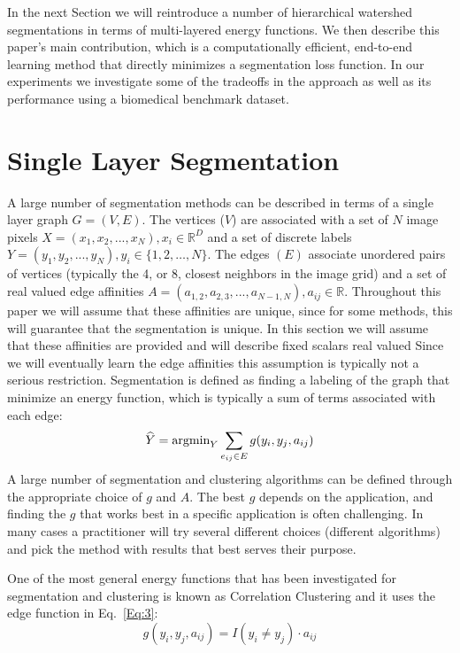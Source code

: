 \documentclass[letterpaper,twocolumn,fleqn]{article}
\begin{document}
In the next Section we will reintroduce a number of hierarchical watershed segmentations in terms of multi-layered energy functions. We then describe this paper's main contribution, which is a computationally efficient, end-to-end learning method that directly minimizes a segmentation loss function. In our experiments we investigate some of the tradeoffs in the approach as well as its performance using a biomedical benchmark dataset.

\section{Single Layer Segmentation}

A large number of segmentation methods can be described in terms of a single layer graph $G = (V, E)$. The vertices ($V$) are associated with a set of $N$ image pixels $X=(x_1,x_2,...,x_N), x_i \in \mathbb{R}^D$ and a set of discrete labels $Y=(y_1,y_2,...,y_N),y_i \in \{1,2,\ldots,N\}$. The edges $(E)$ associate unordered pairs of vertices (typically the 4, or 8, closest neighbors in the image grid) and a set of real valued edge affinities $A=(a_{1,2},a_{2,3},...,a_{N-1,N}), a_{ij} \in \mathbb{R}$. Throughout this paper we will assume that these affinities are unique, since for some methods, this will guarantee that the segmentation is unique. In this section we will assume that these affinities are provided and will describe fixed scalars real valued Since we will eventually learn the edge affinities this assumption is typically not a serious restriction. Segmentation is defined as finding a labeling of the graph that minimize an energy function, which is typically a sum of terms associated with each edge:
\begin{equation}
    \widehat{Y} =\hbox{argmin}_Y\sum_{e_{ij}\in E} g(y_i, y_j, a_{ij})
    \label{Eq:1}
\end{equation}
A large number of segmentation and clustering algorithms can be defined through the appropriate choice of $g$ and $A$. The best $g$ depends on the application, and finding the $g$ that works best in a specific application is often challenging. In many cases a practitioner will try  several different choices (different algorithms) and pick the method with results that best serves their purpose. 

One of the most general energy functions that has been investigated for segmentation and clustering is known as Correlation Clustering \cite{Bansal2004} and it uses the edge function in Eq.~\ref{Eq:3}: 
\begin{equation}
    g(y_i, y_j, a_{ij}) = I(y_i \neq y_j)\cdot a_{ij}
    \label{Eq:3}
\end{equation}
\end{document}
